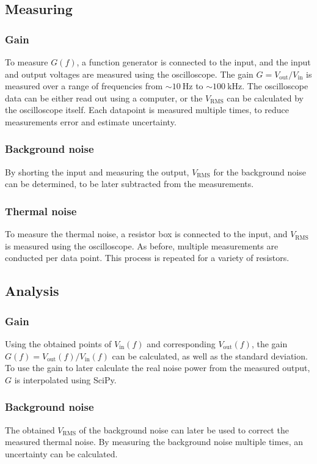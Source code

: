 \documentclass{article}
\begin{document}
\subsection{Measuring}
\subsubsection{Gain}
To measure $G(f)$, a function generator is connected to the input, and the input and output voltages are measured using the oscilloscope.
The gain $G = V_{\text{out}} / V_{\text{in}}$ is measured over a range of frequencies from $\sim\SI{10}{\Hz}$ to $\sim\SI{100}{\kHz}$.
The oscilloscope data can be either read out using a computer, or the $V_{\mathrm{RMS}}$ can be calculated by the oscilloscope itself.
Each datapoint is measured multiple times, to reduce measurements error and estimate uncertainty.
\subsubsection{Background noise}
By shorting the input and measuring the output, $V_{\mathrm{RMS}}$ for the background noise can be determined, to be later subtracted from the measurements.
\subsubsection{Thermal noise}
To measure the thermal noise, a resistor box is connected to the input, and $V_{\mathrm{RMS}}$ is measured using the oscilloscope.
As before, multiple measurements are conducted per data point.
This process is repeated for a variety of resistors.
\subsection{Analysis}
\subsubsection{Gain}
Using the obtained points of $V_{\text{in}}(f)$ and corresponding $V_{\text{out}}(f)$, the gain $G(f) = V_{\text{out}}(f) / V_{\text{in}}(f)$ can be calculated, as well as the standard deviation.
To use the gain to later calculate the real noise power from the measured output, $G$ is interpolated using SciPy.
\subsubsection{Background noise}
The obtained $V_{\mathrm{RMS}}$ of the background noise can later be used to correct the measured thermal noise.
By measuring the background noise multiple times, an uncertainty can be calculated.
\end{document}
